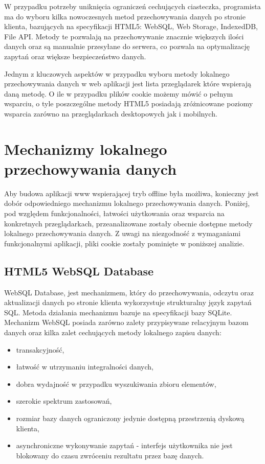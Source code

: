 W przypadku potrzeby uniknięcia ograniczeń cechujących ciasteczka, programista ma do wyboru kilka nowoczesnych metod przechowywania danych po stronie klienta, bazujących na specyfikacji HTML5: WebSQL, Web Storage, IndexedDB, File API. Metody te pozwalają na przechowywanie znacznie większych ilości danych oraz są manualnie przesyłane do serwera, co pozwala na optymalizację zapytań oraz większe bezpieczeństwo danych.

Jednym z kluczowych aspektów w przypadku wyboru metody lokalnego przechowywania danych w web aplikacji jest lista przeglądarek które wspierają daną metodę. O ile w przypadku plików cookie możemy mówić o pełnym wsparciu, o tyle poszczególne metody HTML5 posiadają zróżnicowane poziomy wsparcia zarówno na przeglądarkach desktopowych jak i mobilnych.

\section{Mechanizmy lokalnego przechowywania danych}
\label{sec:mechLokPrzechDanych}

Aby budowa aplikacji www wspierającej tryb offline była możliwa, konieczny jest dobór odpowiedniego mechanizmu lokalnego przechowywania danych. Poniżej, pod względem funkcjonalności, łatwości użytkowania oraz wsparcia na konkretnych przeglądarkach, przeanalizowane zostały obecnie dostępne metody lokalnego przechowywania danych. Z uwagi na niezgodność z wymaganiami funkcjonalnymi aplikacji,  pliki cookie zostały pominięte w poniższej analizie.

\subsection{HTML5 WebSQL Database}
\label{sec:html5WebSqlDatabase}

WebSQL Database\cite{webSqlDb}, jest mechanizmem, który do przechowywania, odczytu oraz aktualizacji danych po stronie klienta wykorzystuje strukturalny język zapytań SQL. Metoda działania mechanizmu bazuje na specyfikacji bazy SQLite. Mechanizm WebSQL posiada zarówno zalety przypisywane relacyjnym bazom danych oraz kilka zalet cechujących metody lokalnego zapisu danych:

\begin{itemize}
\item transakcyjność,
\item łatwość w utrzymaniu integralności danych,
\item dobra wydajność w przypadku wyszukiwania zbioru elementów,
\item szerokie spektrum zastosowań,
\item rozmiar bazy danych ograniczony jedynie dostępną przestrzenią dyskową klienta,
\item asynchroniczne wykonywanie zapytań - interfejs użytkownika nie jest blokowany do czasu zwróceniu rezultatu przez bazę danych.
\end{itemize}

